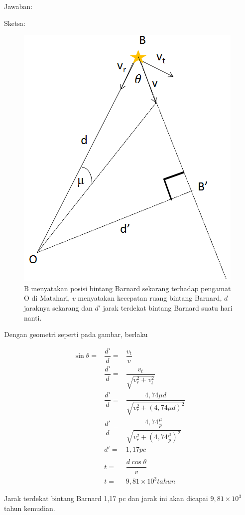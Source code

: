 \documentclass[11pt,fleqn]{exam}
\begin{document}
\begin{questions}
Jawaban:

Sketsa:

\begin{figure}[H]
\centering
\includegraphics[scale=0.55]{barnard.png}
\caption{B menyatakan posisi bintang Barnard sekarang terhadap pengamat O di Matahari, $v$ menyatakan kecepatan ruang bintang Barnard, $d$ jaraknya sekarang dan $d'$ jarak terdekat bintang Barnard suatu hari nanti.}
\end{figure}

Dengan geometri seperti pada gambar, berlaku

\begin{eqnarray*}
\sin \theta=&\dfrac{d'}{d}=&\dfrac{v_t}{v}\\
&\dfrac{d'}{d}=&\dfrac{v_t}{\sqrt{v_r^2+v_t^2}}\\
&\dfrac{d'}{d}=&\dfrac{4,74\mu d}{\sqrt{v_r^2+(4,74\mu d)^2}}\\
&\dfrac{d'}{d}=&\dfrac{4,74\frac{\mu}{p}}{\sqrt{v_r^2+(4,74\frac{\mu}{p})^2}}\\
&d'=&1,17 pc\\
\\
&t=&\dfrac{d\cos \theta}{v}\\
&t=&9,81\times10^3 tahun
\end{eqnarray*}

Jarak terdekat bintang Barnard 1,17 pc dan jarak ini akan dicapai $9,81\times10^3$ tahun kemudian.\\



\end{questions}
\end{document}

